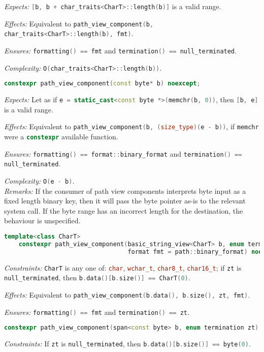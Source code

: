 \documentclass[11pt]{article}
\newcommand{\code}[2][cpp]{\lstinline[language=#1,basicstyle=\small\ttfamily]{#2}}
\newcommand{\desc}[1]{\textit{#1}}
\newcommand{\constraints}{\desc{Constraints: }}
\newcommand{\effects}{\desc{Effects: }}
\newcommand{\expects}{\desc{Expects: }}
\newcommand{\ensures}{\desc{Ensures: }}
\newcommand{\remarks}{\desc{Remarks: }}
\newcommand{\complexity}{\desc{Complexity: }}
\begin{document}
\expects \code{[b, b + char_traits<CharT>::length(b)]} is a valid range.

\effects Equivalent to \code{path_view_component(b, char_traits<CharT>::length(b), fmt)}.

\ensures \code{formatting() == fmt} and \code{termination() == null_terminated}.

\complexity \code{O(char_traits<CharT>::length(b))}.\\

\begin{lstlisting}[language=cpp]
    constexpr path_view_component(const byte* b) noexcept;
\end{lstlisting}

\expects Let as if \code{e = static_cast<const byte *>(memchr(b, 0))}, then \code{[b, e]} is a valid range.

\effects Equivalent to \code{path_view_component(b, (size_type)(e - b))}, if \code{memchr} were a \code{constexpr} available function.

\ensures \code{formatting() == format::binary_format} and \code{termination() == null_terminated}.

\complexity \code{O(e - b)}.\\

\remarks{If the consumer of path view components interprets byte input as a fixed length binary key, then it will pass the byte pointer as-is to the relevant system call. If the byte range has an incorrect length for the destination, the behaviour is unspecified.}

\begin{lstlisting}[language=cpp]
    template<class CharT>
    constexpr path_view_component(basic_string_view<CharT> b, enum termination zt,
                                  format fmt = path::binary_format) noexcept;
\end{lstlisting}
\constraints \code{CharT} is any one of: \code{char}, \code{wchar_t}, \code{char8_t}, \code{char16_t}; if \code{zt} is \code{null_terminated}, then \code{b.data()[b.size()] == CharT(0)}.

\effects Equivalent to \code{path_view_component(b.data(), b.size(), zt, fmt)}.

\ensures \code{formatting() == fmt} and \code{termination() == zt}.\\

\begin{lstlisting}[language=cpp]
    constexpr path_view_component(span<const byte> b, enum termination zt) noexcept;
\end{lstlisting}
\constraints If \code{zt} is \code{null_terminated}, then \code{b.data()[b.size()] == byte(0)}.
\end{document}
